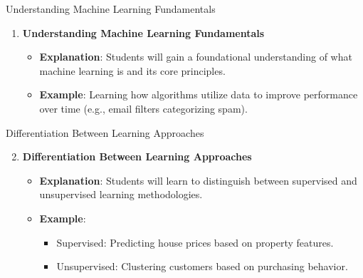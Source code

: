 \documentclass[aspectratio=169]{beamer}
\begin{document}
\begin{frame}[fragile]{Understanding Machine Learning Fundamentals}
    \begin{enumerate}
        \item \textbf{Understanding Machine Learning Fundamentals}
            \begin{itemize}
                \item \textbf{Explanation}: Students will gain a foundational understanding of what machine learning is and its core principles.
                \item \textbf{Example}: Learning how algorithms utilize data to improve performance over time (e.g., email filters categorizing spam).
            \end{itemize}
    \end{enumerate}
\end{frame}

\begin{frame}[fragile]{Differentiation Between Learning Approaches}
    \begin{enumerate}
        \setcounter{enumi}{1}
        \item \textbf{Differentiation Between Learning Approaches}
            \begin{itemize}
                \item \textbf{Explanation}: Students will learn to distinguish between supervised and unsupervised learning methodologies.
                \item \textbf{Example}: 
                \begin{itemize}
                    \item Supervised: Predicting house prices based on property features.
                    \item Unsupervised: Clustering customers based on purchasing behavior.
                \end{itemize}
            \end{itemize}
    \end{enumerate}
\end{frame}
\end{document}

